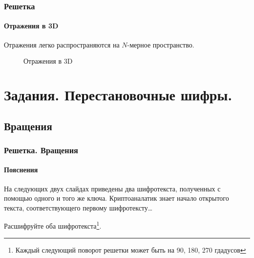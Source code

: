 \begin{frame}
    \frametitle{Решетка}
    \framesubtitle{Отражения в 3D}
    
    Отражения легко распространяются на $N$-мерное пространство.
    \begin{figure}
        \begin{center}
            \caption{Отражения в 3D}\label{pict:flip3d}
        \end{center}
    \end{figure} 
\end{frame}


\section{Задания. Перестановочные шифры.}


\subsection{Вращения}

\begin{frame}[fragile]
    \frametitle{Решетка. Вращения}
    \framesubtitle{Пояснения}
        
    На следующих двух слайдах приведены два шифротекста, полученных с помощью одного и того же ключа. Криптоаналатик знает начало открытого текста, соответствующего первому шифротексту\ldots
    
    Расшифруйте оба шифротекста\footnote{Каждый следующий поворот решетки может быть на 90, 180, 270 гдадусов}.
\end{frame}


